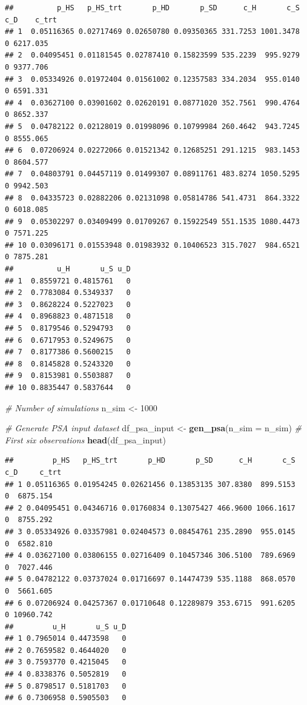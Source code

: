 \documentclass[
]{article}
\newenvironment{Shaded}{\begin{snugshade}}{\end{snugshade}}
\newcommand{\CommentTok}[1]{\textcolor[rgb]{0.56,0.35,0.01}{\textit{#1}}}
\newcommand{\DataTypeTok}[1]{\textcolor[rgb]{0.13,0.29,0.53}{#1}}
\newcommand{\DecValTok}[1]{\textcolor[rgb]{0.00,0.00,0.81}{#1}}
\newcommand{\KeywordTok}[1]{\textcolor[rgb]{0.13,0.29,0.53}{\textbf{#1}}}
\newcommand{\NormalTok}[1]{#1}
\newcommand{\StringTok}[1]{\textcolor[rgb]{0.31,0.60,0.02}{#1}}
\begin{document}
\begin{verbatim}
##          p_HS   p_HS_trt       p_HD       p_SD      c_H       c_S c_D    c_trt
## 1  0.05116365 0.02717469 0.02650780 0.09350365 331.7253 1001.3478   0 6217.035
## 2  0.04095451 0.01181545 0.02787410 0.15823599 535.2239  995.9279   0 9377.706
## 3  0.05334926 0.01972404 0.01561002 0.12357583 334.2034  955.0140   0 6591.331
## 4  0.03627100 0.03901602 0.02620191 0.08771020 352.7561  990.4764   0 8652.337
## 5  0.04782122 0.02128019 0.01998096 0.10799984 260.4642  943.7245   0 8555.065
## 6  0.07206924 0.02272066 0.01521342 0.12685251 291.1215  983.1453   0 8604.577
## 7  0.04803791 0.04457119 0.01499307 0.08911761 483.8274 1050.5295   0 9942.503
## 8  0.04335723 0.02882206 0.02131098 0.05814786 541.4731  864.3322   0 6018.085
## 9  0.05302297 0.03409499 0.01709267 0.15922549 551.1535 1080.4473   0 7571.225
## 10 0.03096171 0.01553948 0.01983932 0.10406523 315.7027  984.6521   0 7875.281
##          u_H       u_S u_D
## 1  0.8559721 0.4815761   0
## 2  0.7783084 0.5349337   0
## 3  0.8628224 0.5227023   0
## 4  0.8968823 0.4871518   0
## 5  0.8179546 0.5294793   0
## 6  0.6717953 0.5249675   0
## 7  0.8177386 0.5600215   0
## 8  0.8145828 0.5243320   0
## 9  0.8153981 0.5503887   0
## 10 0.8835447 0.5837644   0
\end{verbatim}

\begin{Shaded}
\begin{Highlighting}[]
\CommentTok{# Number of simulations}
\NormalTok{n_sim <-}\StringTok{ }\DecValTok{1000}

\CommentTok{# Generate PSA input dataset}
\NormalTok{df_psa_input <-}\StringTok{ }\KeywordTok{gen_psa}\NormalTok{(}\DataTypeTok{n_sim =}\NormalTok{ n_sim)}
\CommentTok{# First six observations}
\KeywordTok{head}\NormalTok{(df_psa_input)}
\end{Highlighting}
\end{Shaded}

\begin{verbatim}
##         p_HS   p_HS_trt       p_HD       p_SD      c_H       c_S c_D     c_trt
## 1 0.05116365 0.01954245 0.02621456 0.13853135 307.8380  899.5153   0  6875.154
## 2 0.04095451 0.04346716 0.01760834 0.13075427 466.9600 1066.1617   0  8755.292
## 3 0.05334926 0.03357981 0.02404573 0.08454761 235.2890  955.0145   0  6582.810
## 4 0.03627100 0.03806155 0.02716409 0.10457346 306.5100  789.6969   0  7027.446
## 5 0.04782122 0.03737024 0.01716697 0.14474739 535.1188  868.0570   0  5661.605
## 6 0.07206924 0.04257367 0.01710648 0.12289879 353.6715  991.6205   0 10960.742
##         u_H       u_S u_D
## 1 0.7965014 0.4473598   0
## 2 0.7659582 0.4644020   0
## 3 0.7593770 0.4215045   0
## 4 0.8338376 0.5052819   0
## 5 0.8798517 0.5181703   0
## 6 0.7306958 0.5905503   0
\end{verbatim}
\end{document}
